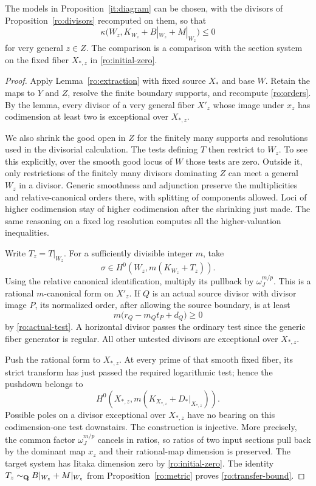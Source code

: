 \begin{proposition}
\label{ro:transfer}
The models in Proposition~\ref{it:diagram} can be chosen, with the
divisors of Proposition~\ref{ro:divisors} recomputed on them, so that
\begin{equation}
 \kappa\bigl(W_z,K_{W_z}+B|_{W_z}+M|_{W_z}\bigr)\le0
 \label{ro:transfer-bound}
\end{equation}
for very general $z\in Z$.  The comparison is a comparison with the
section system on the fixed fiber $X_{*,z}$ in
\eqref{ro:initial-zero}.
\end{proposition}

\begin{proof}
Apply Lemma~\ref{ro:extraction} with fixed source $X_*$ and base $W$.
Retain the maps to $Y$ and $Z$, resolve the finite boundary supports,
and recompute \eqref{ro:orders}.  By the lemma, every divisor of a very
general fiber $X'_z$ whose image under $x_z$ has codimension at least two
is exceptional over $X_{*,z}$.

We also shrink the good open in $Z$ for the finitely many supports and
resolutions used in the divisorial calculation.  The tests defining $T$
then restrict to $W_z$.  To see this explicitly, over the smooth good
locus of $W$ those tests are zero.  Outside it, only restrictions of the
finitely many divisors dominating $Z$ can meet a general $W_z$ in a
divisor.  Generic smoothness and adjunction preserve the multiplicities
and relative-canonical orders there, with splitting of components
allowed.  Loci of higher codimension stay of higher codimension after
the shrinking just made.  The same reasoning on a fixed log resolution
computes all the higher-valuation inequalities.

Write $T_z=T|_{W_z}$.  For a sufficiently divisible integer $m$, take
\[
 \sigma\in H^0(W_z,m(K_{W_z}+T_z)).
\]
Using the relative canonical identification, multiply its pullback by
$\omega_J^{m/p}$.  This is a rational $m$-canonical form on $X'_z$.
If $Q$ is an actual source divisor with divisor image $P$, its normalized
order, after allowing the source boundary, is at least
\[
 m\bigl(r_Q-m_Qt_P+d_Q\bigr)\ge0
\]
by \eqref{ro:actual-test}.  A horizontal divisor passes the ordinary
test since the generic fiber generator is regular.  All other
untested divisors are exceptional over $X_{*,z}$.

Push the rational form to $X_{*,z}$.  At every prime of that smooth
fixed fiber, its strict transform has just passed the required
logarithmic test; hence the pushdown belongs to
\[
 H^0(X_{*,z},m(K_{X_{*,z}}+D_*|_{X_{*,z}})).
\]
Possible poles on a divisor exceptional over $X_{*,z}$ have no bearing
on this codimension-one test downstairs.  The construction is
injective.  More precisely, the common factor $\omega_J^{m/p}$ cancels
in ratios, so ratios of two input sections pull back by the dominant
map $x_z$ and their rational-map dimension is preserved.  The target
system has Iitaka dimension zero by \eqref{ro:initial-zero}.  The
identity $T_z\sim_{\mathbf Q}B|_{W_z}+M|_{W_z}$ from
Proposition~\ref{ro:metric} proves \eqref{ro:transfer-bound}.
\end{proof}

